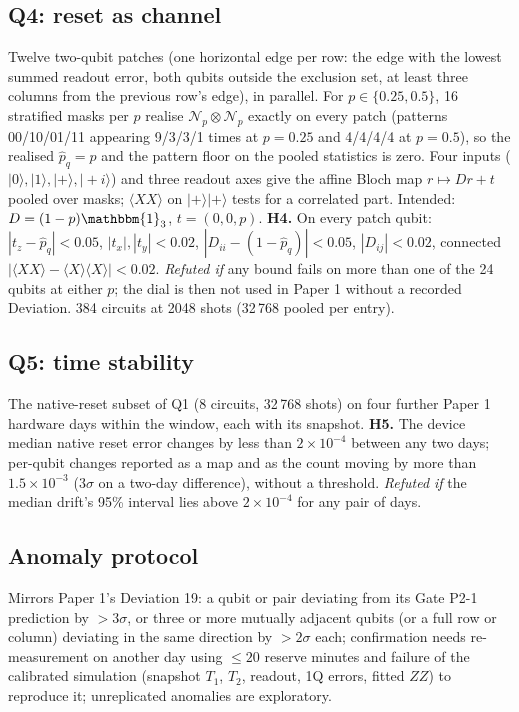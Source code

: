 \documentclass[aps,pra,reprint,superscriptaddress,nofootinbib,longbibliography,amsmath,amssymb]{revtex4-2}
\newcommand{\Np}{\mathcal{N}_p}
\begin{document}
\subsection{Q4: reset as channel}
Twelve two-qubit patches (one horizontal edge per row: the edge with the lowest summed readout error, both qubits outside the exclusion set, at least three columns from the previous row's edge), in parallel. For $p \in \{0.25, 0.5\}$, 16 stratified masks per $p$ realise $\Np\otimes\Np$ exactly on every patch (patterns 00/10/01/11 appearing 9/3/3/1 times at $p = 0.25$ and 4/4/4/4 at $p = 0.5$), so the realised $\hat p_q = p$ and the pattern floor on the pooled statistics is zero. Four inputs ($|0\rangle, |1\rangle, |+\rangle, |{+}i\rangle$) and three readout axes give the affine Bloch map $r \mapsto Dr + t$ pooled over masks; $\langle XX\rangle$ on $|+\rangle|+\rangle$ tests for a correlated part. Intended: $D = (1-p)\mathbbm{1}_3$, $t = (0, 0, p)$. \textbf{H4.} On every patch qubit: $|t_z - \hat p_q| < 0.05$, $|t_x|, |t_y| < 0.02$, $|D_{ii} - (1 - \hat p_q)| < 0.05$, $|D_{ij}| < 0.02$, connected $|\langle XX\rangle - \langle X\rangle\langle X\rangle| < 0.02$. \emph{Refuted if} any bound fails on more than one of the 24 qubits at either $p$; the dial is then not used in Paper 1 without a recorded Deviation. 384 circuits at 2048 shots (32\,768 pooled per entry).

\subsection{Q5: time stability}
The native-reset subset of Q1 (8 circuits, 32\,768 shots) on four further Paper 1 hardware days within the window, each with its snapshot. \textbf{H5.} The device median native reset error changes by less than $2\times10^{-4}$ between any two days; per-qubit changes reported as a map and as the count moving by more than $1.5\times10^{-3}$ ($3\sigma$ on a two-day difference), without a threshold. \emph{Refuted if} the median drift's 95\% interval lies above $2\times10^{-4}$ for any pair of days.

\subsection{Anomaly protocol}
Mirrors Paper 1's Deviation 19: a qubit or pair deviating from its Gate P2-1 prediction by $> 3\sigma$, or three or more mutually adjacent qubits (or a full row or column) deviating in the same direction by $> 2\sigma$ each; confirmation needs re-measurement on another day using $\leq 20$ reserve minutes and failure of the calibrated simulation (snapshot $T_1$, $T_2$, readout, 1Q errors, fitted $ZZ$) to reproduce it; unreplicated anomalies are exploratory.
\end{document}
